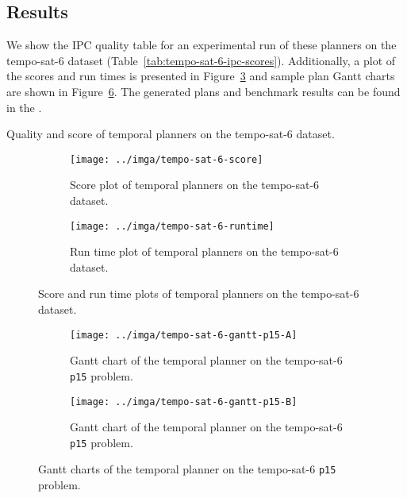 \subsection{Results}\label{temporal-results}

We show the IPC quality table
for an experimental run of these planners on the tempo-sat-6 dataset (Table~\ref{tab:tempo-sat-6-ipc-scores}).
Additionally, a plot of the scores and run times is presented in Figure~\ref{fig:tempo-sat-6-plots} and sample plan Gantt charts are shown in Figure~\ref{fig:tempo-sat-6-gantt}. The generated plans and benchmark results can be found in the .

\begin{table}
\centering

\caption{Quality and score of temporal planners on the tempo-sat-6 dataset.}
\label{tab:tempo-sat-6-ipc-scores}
\end{table}

\begin{figure}
\centering
\begin{subfigure}{\textwidth}
\centering
\texttt{[image: ../imga/tempo-sat-6-score]}
\caption{Score plot of temporal planners on the tempo-sat-6 dataset.}
\label{fig:tempo-sat-6-score}
\end{subfigure}

\begin{subfigure}{\textwidth}
\centering
\texttt{[image: ../imga/tempo-sat-6-runtime]}
\caption{Run time plot of temporal planners on the tempo-sat-6 dataset.}
\label{fig:tempo-sat-6-runtime}
\end{subfigure}
\caption{Score and run time plots of temporal planners on the tempo-sat-6 dataset.}
\label{fig:tempo-sat-6-plots}
\end{figure}

\begin{figure}
\centering
\begin{subfigure}{\textwidth}
\centering
\texttt{[image: ../imga/tempo-sat-6-gantt-p15-A]}
\caption{Gantt chart of the temporal planner  on the tempo-sat-6 \texttt{p15} problem.}
\label{fig:tempo-sat-6-gantt-15-a}
\end{subfigure}

\begin{subfigure}{\textwidth}
\centering
\texttt{[image: ../imga/tempo-sat-6-gantt-p15-B]}
\caption{Gantt chart of the temporal planner  on the tempo-sat-6 \texttt{p15} problem.}
\label{fig:tempo-sat-6-gantt-15-b}
\end{subfigure}
\caption{Gantt charts of the temporal planner  on the tempo-sat-6 \texttt{p15} problem.}
\label{fig:tempo-sat-6-gantt}
\end{figure}

